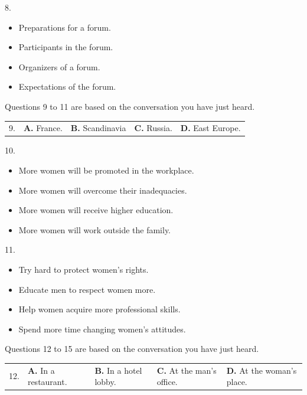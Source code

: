 \documentclass[UTF8,11pt]{ctexart}
\begin{document}
8.


\begin{itemize}[leftmargin=2em,itemsep=.2em,topsep=.4em]\item[A.] Preparations for a forum.
\item[B.] Participants in the forum.
\item[C.] Organizers of a forum.
\item[D.] Expectations of the forum.
\end{itemize}

Questions 9 to 11 are based on the conversation you have just heard.


\noindent\begin{tabularx}{\linewidth}{@{}lXXXX@{}}9. & \textbf{A.} France. & \textbf{B.} Scandinavia & \textbf{C.} Russia. & \textbf{D.} East Europe.\\\end{tabularx}\par

10.


\begin{itemize}[leftmargin=2em,itemsep=.2em,topsep=.4em]\item[A.] More women will be promoted in the workplace.
\item[B.] More women will overcome their inadequacies.
\item[C.] More women will receive higher education.
\item[D.] More women will work outside the family.
\end{itemize}

11.


\begin{itemize}[leftmargin=2em,itemsep=.2em,topsep=.4em]\item[A.] Try hard to protect women’s rights.
\item[B.] Educate men to respect women more.
\end{itemize}

\begin{itemize}[leftmargin=2em,itemsep=.2em,topsep=.4em]\item[C.] Help women acquire more professional skills.
\item[D.] Spend more time changing women’s attitudes.
\end{itemize}

Questions 12 to 15 are based on the conversation you have just heard.


\noindent\begin{tabularx}{\linewidth}{@{}lXXXX@{}}12. & \textbf{A.} In a restaurant. & \textbf{B.} In a hotel lobby. & \textbf{C.} At the man’s office. & \textbf{D.} At the woman’s place.\\\end{tabularx}\par
\end{document}
